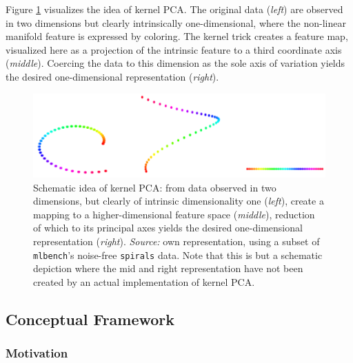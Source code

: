 Figure \ref{fig-spirals} visualizes the idea of kernel PCA.
The original data (\textit{left}) are observed in two dimensions but clearly 
intrinsically one-dimensional, where the non-linear manifold feature is 
expressed by coloring. 
The kernel trick creates a feature map, visualized here as a projection of 
the intrinsic feature to a third coordinate axis (\textit{middle}). 
Coercing the data to this dimension as the sole axis of variation yields the 
desired one-dimensional representation (\textit{right}). 

\begin{figure}[H]
  \centering
  \includegraphics[width = \textwidth]{figures/spirals}
  \caption[Schematic idea of kernel PCA]{Schematic idea of kernel PCA: from data
  observed in two dimensions, but clearly of intrinsic dimensionality one 
  (\textit{left}), create a mapping to a higher-dimensional feature space 
  (\textit{middle}), reduction of which to its principal axes yields the desired 
  one-dimensional representation (\textit{right}).
  \textit{Source:} own representation, using a subset of \texttt{mlbench}'s 
  noise-free \texttt{spirals} data. Note that this is but a schematic depiction 
  where the mid and right representation have not been created by an actual 
  implementation of kernel PCA.}
  \label{fig-spirals}
\end{figure}


\subsection{Conceptual Framework}
\label{framework}


\subsubsection{Motivation}
\label{motivation}

